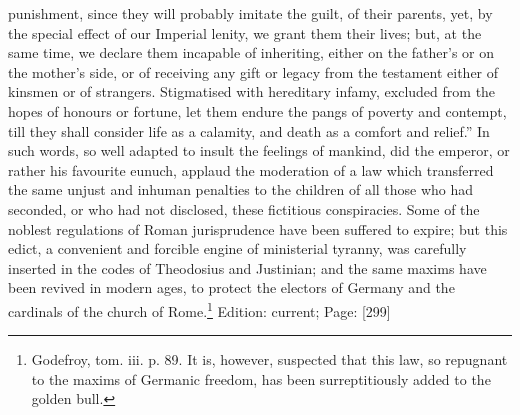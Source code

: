 punishment, since they will probably imitate the guilt, of their parents, yet, by the special effect of our Imperial lenity, we grant them their lives; but, at the same time, we declare them incapable of inheriting, either on the father\texthebrew{}’s or on the mother\texthebrew{}’s side, or of receiving any gift or legacy from the testament either of kinsmen or of strangers. Stigmatised with hereditary infamy, excluded from the hopes of honours or fortune, let them endure the pangs of poverty and contempt, till they shall consider life as a calamity, and death as a comfort and relief.\texthebrew{}” In such words, so well adapted to insult the feelings of mankind, did the emperor, or rather his favourite eunuch, applaud the moderation of a law which transferred the same unjust and inhuman penalties to the children of all those who had seconded, or who had not disclosed, these fictitious conspiracies. Some of the noblest regulations of Roman jurisprudence have been suffered to expire; but this edict, a convenient and forcible engine of ministerial tyranny, was carefully inserted in the codes of Theodosius and Justinian; and the same maxims have been revived in modern ages, to protect the electors of Germany and the cardinals of the church of Rome.\footnote{Godefroy, tom. iii. p. 89. It is, however, suspected that this law, so repugnant to the maxims of Germanic freedom, has been surreptitiously added to the golden bull.}
Edition: current; Page: [299]

